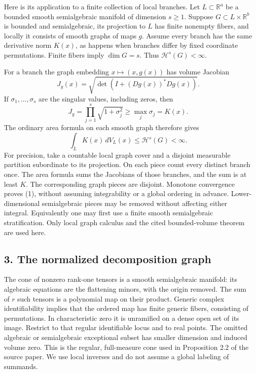 \documentclass[
  11pt,
]{article}
\begin{document}
Here is its application to a finite collection of local branches. Let
\(L\subset\mathbb R^a\) be a bounded smooth semialgebraic manifold of
dimension \(s\ge1\). Suppose \(G\subset L\times\mathbb R^b\) is bounded
and semialgebraic, its projection to \(L\) has finite nonempty fibers,
and locally it consists of smooth graphs of maps \(g\). Assume every
branch has the same derivative norm \(K(x)\), as happens when branches
differ by fixed coordinate permutations. Finite fibers imply
\(\dim G=s\). Thus \(\mathcal H^s(G)<\infty\).

For a branch the graph embedding \(x\mapsto(x,g(x))\) has volume
Jacobian \[
J_g(x)=\sqrt{\det(I+(Dg(x))^*Dg(x))}.
\] If \(\sigma_1,\ldots,\sigma_s\) are the singular values, including
zeros, then \[
J_g=\prod_{j=1}^s\sqrt{1+\sigma_j^2}\ge\max_j\sigma_j=K(x).
\] The ordinary area formula on each smooth graph therefore gives \[
\int_L K(x)\,dV_L(x)\le \mathcal H^s(G)<\infty. \tag{1}
\] For precision, take a countable local graph cover and a disjoint
measurable partition subordinate to its projection. On each piece count
every distinct branch once. The area formula sums the Jacobians of those
branches, and the sum is at least \(K\). The corresponding graph pieces
are disjoint. Monotone convergence proves (1), without assuming
integrability or a global ordering in advance. Lower-dimensional
semialgebraic pieces may be removed without affecting either integral.
Equivalently one may first use a finite smooth semialgebraic
stratification. Only local graph calculus and the cited bounded-volume
theorem are used here.

\subsection{3. The normalized decomposition
graph}\label{the-normalized-decomposition-graph}

The cone of nonzero rank-one tensors is a smooth semialgebraic manifold:
its algebraic equations are the flattening minors, with the origin
removed. The sum of \(r\) such tensors is a polynomial map on their
product. Generic complex identifiability implies that the ordered map
has finite generic fibers, consisting of permutations. In characteristic
zero it is unramified on a dense open set of its image. Restrict to that
regular identifiable locus and to real points. The omitted algebraic or
semialgebraic exceptional subset has smaller dimension and induced
volume zero. This is the regular, full-measure cone used in Proposition
2.2 of the source paper. We use local inverses and do not assume a
global labeling of summands.
\end{document}
